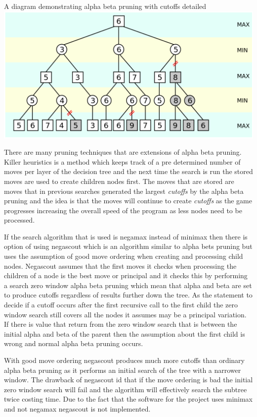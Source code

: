 \documentclass[final]{cmpreport}
\begin{document}
\begin{cmpfigure}[htb]{A diagram demonstrating alpha beta pruning with cutoffs detailed}
	\includegraphics[scale=0.36]{AB.png}
\end{cmpfigure} 
\FloatBarrier
There are many pruning techniques that are extensions of alpha beta pruning. Killer heuristics is a method which keeps track of a pre determined number of moves per layer of the decision tree and the next time the search is run the stored moves are used to create children nodes first. The moves that are stored are moves that in previous searches generated the largest \textit{cutoffs} by the alpha beta pruning and the idea is that the moves will continue to create \textit{cutoffs} as the game progresses increasing the overall speed of the program as less nodes need to be processed.

If the search algorithm that is used is negamax instead of minimax then there is option of using negascout which is an algorithm similar to alpha bets pruning but uses the assumption of good move ordering when creating and processing child nodes. Negascout assumes that the first moves it checks when processing the children of a node is the best move or principal and it checks this by performing a search zero window alpha beta pruning which mean that alpha and beta are set to produce cutoffs regardless of results further down the tree. As the statement to decide if a cutoff occurs after the first recursive call to the first child the zero window search still covers all the nodes it assumes may be a principal variation. If there is value that return from the zero window search that is between the initial alpha and beta of the parent then the assumption about the first child is wrong and normal alpha beta pruning occurs.

With good move ordering negascout produces much more cutoffs than ordinary alpha beta pruning as it performs an initial search of the tree with a narrower window. The drawback of negascout id that if the move ordering is bad the initial zero window search will fail and the algorithm will effectively search the subtree twice costing time. Due to the fact that the software for the project uses minimax and not negamax negascout is not implemented.   
\end{document}

